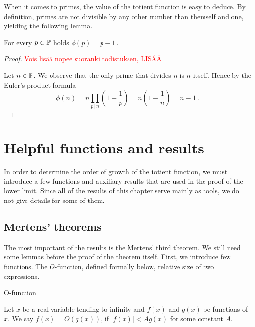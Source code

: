\documentclass{article}
\begin{document}
When it comes to primes, the value of the totient function is easy to deduce. By definition, primes are not divisible by any other number than themself and one, yielding the following lemma.

\begin{lemma}
\label{thm:phiprime}
For every $p \in \mathbb{P}$ holds $\phi(p) = p-1$\,.

\begin{proof}

\textcolor{red}{Vois lisää nopee suoranki todistuksen, LISÄÄ}

Let $n\in\mathbb{P}$. We observe that the only prime that divides $n$ is $n$ itself. Hence by the Euler's product formula
\begin{equation*}
    \phi(n) = n \prod_{p \,\vert\, n} \left(1 - \frac{1}{p}\right) = n\left(1-\frac{1}{n}\right) = n-1\,.
\end{equation*}

\end{proof}

\end{lemma}

\section{Helpful functions and results}
\label{apujutut}

In order to determine the order of growth of the totient function, we must introduce a few functions and auxiliary results that are used in the proof of the lower limit. Since all of the results of this chapter serve mainly as tools, we do not give details for some of them.

\subsection{Mertens' theorems}

The most important of the results is the Mertens' third theorem. We still need some lemmas before the proof of the theorem itself. First, we introduce few functions. The $O$-function, defined formally below, relative size of two expressions.

\begin{definition}
O-function

Let $x$ be a real variable tending to infinity and $f(x)$ and $g(x)$ be functions of $x$. We say $f(x)=O(g(x))$, if $\vert f(x) \vert < Ag(x)$ for some constant $A$.
\end{definition}
\end{document}
